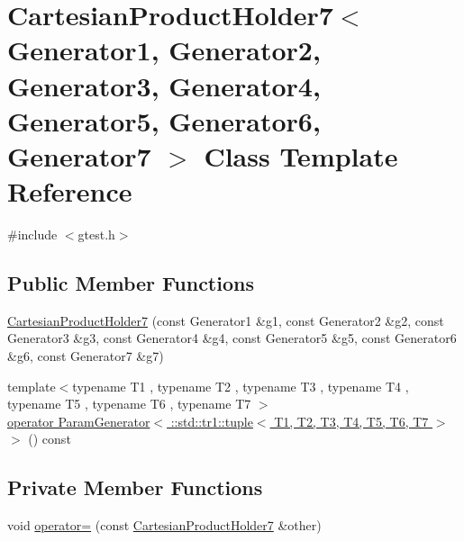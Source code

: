 \hypertarget{classtesting_1_1internal_1_1CartesianProductHolder7}{\section{\-Cartesian\-Product\-Holder7$<$ \-Generator1, \-Generator2, \-Generator3, \-Generator4, \-Generator5, \-Generator6, \-Generator7 $>$ \-Class \-Template \-Reference}
\label{d5/d88/classtesting_1_1internal_1_1CartesianProductHolder7}
}


{\ttfamily \#include $<$gtest.\-h$>$}

\subsection*{\-Public \-Member \-Functions}
\begin{DoxyCompactItemize}
\item 
\hyperlink{classtesting_1_1internal_1_1CartesianProductHolder7_ae8c879fa2157b5fbef8f4e2d31c003db}{\-Cartesian\-Product\-Holder7} (const \-Generator1 \&g1, const \-Generator2 \&g2, const \-Generator3 \&g3, const \-Generator4 \&g4, const \-Generator5 \&g5, const \-Generator6 \&g6, const \-Generator7 \&g7)
\item 
{\footnotesize template$<$typename T1 , typename T2 , typename T3 , typename T4 , typename T5 , typename T6 , typename T7 $>$ }\\\hyperlink{classtesting_1_1internal_1_1CartesianProductHolder7_a2438803c51d5510e7098917a95a0a044}{operator Param\-Generator$<$ \-::std\-::tr1\-::tuple$<$ T1, T2, T3, T4, T5, T6, T7 $>$ $>$} () const 
\end{DoxyCompactItemize}
\subsection*{\-Private \-Member \-Functions}
\begin{DoxyCompactItemize}
\item 
void \hyperlink{classtesting_1_1internal_1_1CartesianProductHolder7_a1c6f2f8076aa202fb3f54f05f6fe3e80}{operator=} (const \hyperlink{classtesting_1_1internal_1_1CartesianProductHolder7}{\-Cartesian\-Product\-Holder7} \&other)
\end{DoxyCompactItemize}
